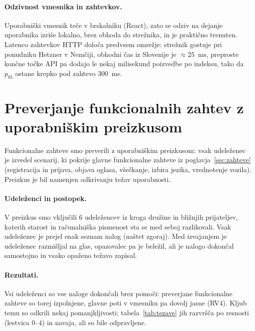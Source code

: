 \paragraph{Odzivnost vmesnika in zahtevkov.}
Uporabniški vmesnik teče v brskalniku (React), zato se odziv na dejanje
uporabnika izriše lokalno, brez obhoda do strežnika, in je praktično trenuten.
Latenco zahtevkov HTTP določa predvsem omrežje: strežnik gostuje pri ponudniku
Hetzner v Nemčiji, obhodni čas iz Slovenije je $\approx 25$~ms, preproste
končne točke API pa dodajo le nekaj milisekund poizvedbe po indeksu, tako da $p_{95}$
ostane krepko pod zahtevo $300$~ms.

\section{Preverjanje funkcionalnih zahtev z uporabniškim preizkusom}
\label{sec:funkcionalne}
\label{sec:uporabniki}

Funkcionalne zahteve smo preverili z uporabniškim preizkusom: vsak udeleženec
je izvedel scenarij, ki pokrije glavne funkcionalne zahteve iz
poglavja~\ref{sec:zahteve} (registracija in prijava, objava oglasa, všečkanje,
izbira jezika, vrednotenje vozila). Preizkus je bil namenjen odkrivanju težav uporabnosti.

\paragraph{Udeleženci in postopek.}
V preizkus smo vključili 6 udeležencev iz kroga družine in bližnjih
prijateljev, katerih starost in računalniška pismenost sta se med seboj
razlikovali. Vsak udeleženec je prejel enak seznam nalog (naštet zgoraj). Med
izvajanjem je udeleženec razmišljal na glas, opazovalec pa je beležil, ali je
nalogo dokončal samostojno in vsako opaženo težavo zapisal.

\paragraph{Rezultati.}
Vsi udeleženci so vse naloge dokončali brez pomoči: preverjane funkcionalne
zahteve so torej izpolnjene, glavne poti v vmesniku pa dovolj jasne (RV4).
Kljub temu so odkrili nekaj
pomanjkljivosti; tabela~\ref{tab:tezave} jih razvršča po resnosti (lestvica
$0$--$4$) in navaja, ali so bile odpravljene.


